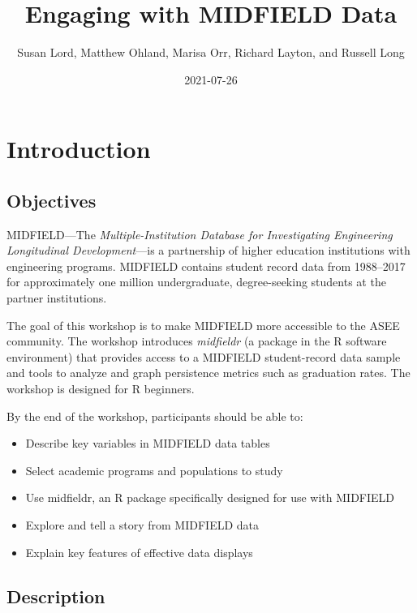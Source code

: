 \documentclass[
]{book}
\title{Engaging with MIDFIELD Data}
\author{Susan Lord, Matthew Ohland, Marisa Orr, Richard Layton, and Russell Long}
\date{2021-07-26}
\providecommand{\tightlist}{%
  \setlength{\itemsep}{0pt}\setlength{\parskip}{0pt}}
\begin{document}
\maketitle

{
\setcounter{tocdepth}{1}
\tableofcontents
}
\hypertarget{introduction}{%
\chapter{Introduction}\label{introduction}}

\hypertarget{objectives}{%
\section*{Objectives}\label{objectives}}

MIDFIELD---The \emph{Multiple-Institution Database for Investigating Engineering Longitudinal Development}---is a partnership of higher education institutions with engineering programs. MIDFIELD contains student record data from 1988--2017 for approximately one million undergraduate, degree-seeking students at the partner institutions.

The goal of this workshop is to make MIDFIELD more accessible to the ASEE community. The workshop introduces \emph{midfieldr} (a package in the R software environment) that provides access to a MIDFIELD student-record data sample and tools to analyze and graph persistence metrics such as graduation rates. The workshop is designed for R beginners.

By the end of the workshop, participants should be able to:

\begin{itemize}
\tightlist
\item
  Describe key variables in MIDFIELD data tables
\item
  Select academic programs and populations to study
\item
  Use midfieldr, an R package specifically designed for use with MIDFIELD
\item
  Explore and tell a story from MIDFIELD data
\item
  Explain key features of effective data displays
\end{itemize}

\hypertarget{description}{%
\section*{Description}\label{description}}
\end{document}
